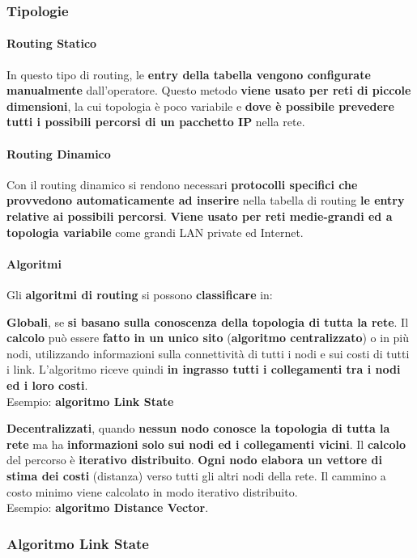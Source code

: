 \documentclass[10pt]{article}
\begin{document}
\subsubsection{Tipologie}
\paragraph{Routing Statico} In questo tipo di routing, le \textbf{entry della tabella vengono configurate manualmente} dall'operatore. Questo metodo \textbf{viene usato per reti di piccole dimensioni}, la cui topologia è poco variabile e \textbf{dove è possibile prevedere tutti i possibili percorsi di un pacchetto IP} nella rete.
\paragraph{Routing Dinamico} Con il routing dinamico si rendono necessari \textbf{protocolli specifici che provvedono automaticamente ad inserire} nella tabella di routing \textbf{le entry relative ai possibili percorsi}. \textbf{Viene usato per reti medie-grandi ed a topologia variabile} come grandi LAN private ed Internet.
\paragraph{Algoritmi} Gli \textbf{algoritmi di routing} si possono \textbf{classificare} in:
\begin{list}{}{}
\item \textbf{Globali}, se \textbf{si basano sulla conoscenza della topologia di tutta la rete}. Il \textbf{calcolo} può essere \textbf{fatto in un unico sito} (\textbf{algoritmo centralizzato}) o in più nodi, utilizzando informazioni sulla connettività di tutti i nodi e sui costi di tutti i link. L'algoritmo riceve quindi \textbf{in ingrasso tutti i collegamenti tra i nodi ed i loro costi}.\\Esempio: \textbf{algoritmo Link State}
\item \textbf{Decentralizzati}, quando \textbf{nessun nodo conosce la topologia di tutta la rete} ma ha \textbf{informazioni solo sui nodi ed i collegamenti vicini}. Il \textbf{calcolo} del percorso è \textbf{iterativo distribuito}. \textbf{Ogni nodo elabora un vettore di stima dei costi} (distanza) verso tutti gli altri nodi della rete. Il cammino a costo minimo viene calcolato in modo iterativo distribuito.\\Esempio: \textbf{algoritmo Distance Vector}.
\end{list}
\pagebreak
\subsubsection{Algoritmo Link State}
\end{document}
